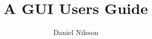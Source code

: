 \documentclass[a4paper]{article}
\begin{document}
\title{A GUI Users Guide}
\author{Daniel Nilsson}
\maketitle


\end{document}
